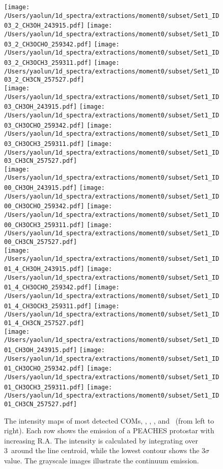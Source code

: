 \newpage\begin{figure*}[htbp!]
  \centering
  \texttt{[image: /Users/yaolun/1d\_spectra/extractions/moment0/subset/Set1\_ID03\_2\_CH3OH\_243915.pdf]}
  \texttt{[image: /Users/yaolun/1d\_spectra/extractions/moment0/subset/Set1\_ID03\_2\_CH3OCHO\_259342.pdf]}
  \texttt{[image: /Users/yaolun/1d\_spectra/extractions/moment0/subset/Set1\_ID03\_2\_CH3OCH3\_259311.pdf]}
  \texttt{[image: /Users/yaolun/1d\_spectra/extractions/moment0/subset/Set1\_ID03\_2\_CH3CN\_257527.pdf]}
  \\
  \texttt{[image: /Users/yaolun/1d\_spectra/extractions/moment0/subset/Set1\_ID03\_CH3OH\_243915.pdf]}
  \texttt{[image: /Users/yaolun/1d\_spectra/extractions/moment0/subset/Set1\_ID03\_CH3OCHO\_259342.pdf]}
  \texttt{[image: /Users/yaolun/1d\_spectra/extractions/moment0/subset/Set1\_ID03\_CH3OCH3\_259311.pdf]}
  \texttt{[image: /Users/yaolun/1d\_spectra/extractions/moment0/subset/Set1\_ID03\_CH3CN\_257527.pdf]}
  \\
  \texttt{[image: /Users/yaolun/1d\_spectra/extractions/moment0/subset/Set1\_ID00\_CH3OH\_243915.pdf]}
  \texttt{[image: /Users/yaolun/1d\_spectra/extractions/moment0/subset/Set1\_ID00\_CH3OCHO\_259342.pdf]}
  \texttt{[image: /Users/yaolun/1d\_spectra/extractions/moment0/subset/Set1\_ID00\_CH3OCH3\_259311.pdf]}
  \texttt{[image: /Users/yaolun/1d\_spectra/extractions/moment0/subset/Set1\_ID00\_CH3CN\_257527.pdf]}
  \\
  \texttt{[image: /Users/yaolun/1d\_spectra/extractions/moment0/subset/Set1\_ID01\_4\_CH3OH\_243915.pdf]}
  \texttt{[image: /Users/yaolun/1d\_spectra/extractions/moment0/subset/Set1\_ID01\_4\_CH3OCHO\_259342.pdf]}
  \texttt{[image: /Users/yaolun/1d\_spectra/extractions/moment0/subset/Set1\_ID01\_4\_CH3OCH3\_259311.pdf]}
  \texttt{[image: /Users/yaolun/1d\_spectra/extractions/moment0/subset/Set1\_ID01\_4\_CH3CN\_257527.pdf]}
  \\
  \texttt{[image: /Users/yaolun/1d\_spectra/extractions/moment0/subset/Set1\_ID01\_CH3OH\_243915.pdf]}
  \texttt{[image: /Users/yaolun/1d\_spectra/extractions/moment0/subset/Set1\_ID01\_CH3OCHO\_259342.pdf]}
  \texttt{[image: /Users/yaolun/1d\_spectra/extractions/moment0/subset/Set1\_ID01\_CH3OCH3\_259311.pdf]}
  \texttt{[image: /Users/yaolun/1d\_spectra/extractions/moment0/subset/Set1\_ID01\_CH3CN\_257527.pdf]}
  \\
  \caption{The intensity maps of most detected COMs, \methanol, \methylcyanide, \methylformate, and \dimethylether\ (from left to right).  
          Each row shows the emission of a PEACHES protostar with increasing R.A.
          The intensity is calculated by integrating over 3\kms\ around the line centroid, while the lowest contour shows the 3$\sigma$ value.  
          The grayscale images illustrate the continuum emission.}
  \label{fig:coms_map_all}
\end{figure*}

